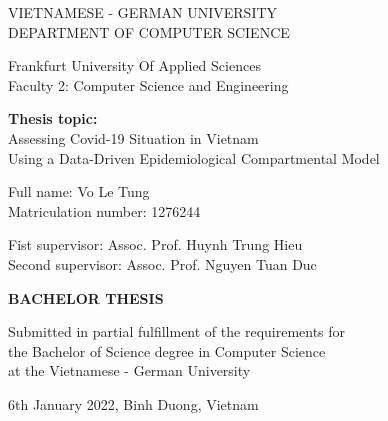 \documentclass[a4paper,11pt]{report}
\begin{document}

\begin{titlepage}
    \begin{center}
        \LARGE

        VIETNAMESE - GERMAN UNIVERSITY\\
        DEPARTMENT OF COMPUTER SCIENCE

        \vspace*{0.5cm}

        Frankfurt University Of Applied Sciences\\
        Faculty 2: Computer Science and Engineering

        \vspace*{2cm}

        \Large

        \textbf{Thesis topic:}\\
        Assessing Covid-19 Situation in Vietnam\\
        Using a Data-Driven Epidemiological Compartmental Model

        \vspace*{2cm}

        \large

        Full name: Vo Le Tung\\
        Matriculation number: 1276244

        \vspace*{0.5cm}

        Fist supervisor: Assoc. Prof. Huynh Trung Hieu\\
        Second supervisor: Assoc. Prof. Nguyen Tuan Duc

        \vspace*{2cm}

        \LARGE
        \textbf{BACHELOR THESIS}

        \vspace*{2cm}

        \large
        Submitted in partial fulfillment of the requirements for\\
        the Bachelor of Science degree in Computer Science\\
        at the Vietnamese - German University

        \vfill

        6th January 2022, Binh Duong, Vietnam
    \end{center}
\end{titlepage}
\end{document}
